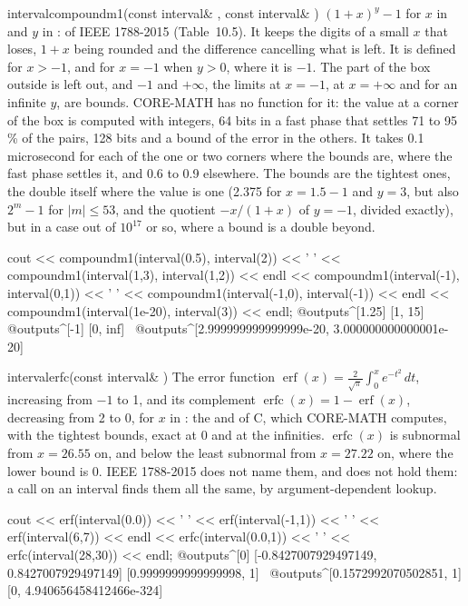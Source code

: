 \documentclass[12pt,a4paper,twoside,openright]{book}
\begin{document}
\begin{deffun}{interval}{compoundm1}{(const interval\& , const interval\& )}
  $(1+x)^y-1$ for $x$ in  and $y$ in :  of
  IEEE 1788-2015 (Table~10.5). It keeps the digits of a small $x$ that
   loses, $1+x$ being rounded and the difference
  cancelling what is left. It is defined for $x>-1$, and for $x=-1$ when
  $y>0$, where it is $-1$. The part of the box outside is left out, and $-1$
  and $+\infty$, the limits at $x=-1$, at $x=+\infty$ and for an infinite
  $y$, are bounds. CORE-MATH has no function for it: the value at a corner
  of the box is computed with integers, 64 bits in a fast phase that settles
  71 to 95\,\% of the pairs, 128 bits and a bound of the error in the others.
  It takes 0.1 microsecond for each of the one or two corners where the
  bounds are, where the fast phase settles it, and 0.6 to 0.9 elsewhere. The
  bounds are the tightest ones, the double itself where the value is one
  (2.375 for $x=1.5-1$ and $y=3$, but also $2^m-1$ for $|m|\le53$, and the
  quotient $-x/(1+x)$ of $y=-1$, divided exactly), but in a case out of
  $10^{17}$ or so, where a bound is a double beyond.\newinvfive
\begin{example}
cout << compoundm1(interval(0.5), interval(2)) << ' '
     << compoundm1(interval(1,3), interval(1,2)) << endl
     << compoundm1(interval(-1), interval(0,1)) << ' '
     << compoundm1(interval(-1,0), interval(-1)) << endl
     << compoundm1(interval(1e-20), interval(3)) << endl;
@outputs^[1.25] [1, 15]~
@outputs^[-1] [0, inf]~
@outputs^[2.999999999999999e-20, 3.000000000000001e-20]~
\end{example}
\end{deffun}

\begin{deffun}{interval}{erfc}{(const interval\& )}
  The error function $\operatorname{erf}(x)=\frac{2}{\sqrt{\pi}}\int_0^x
  e^{-t^2}\,dt$, increasing from $-1$ to 1, and its complement
  $\operatorname{erfc}(x)=1-\operatorname{erf}(x)$, decreasing from 2 to 0,
  for $x$ in : the  and  of C, which CORE-MATH
  computes, with the tightest bounds, exact at 0 and at the infinities.
  $\operatorname{erfc}(x)$ is subnormal from $x=26.55$ on, and below the
  least subnormal from $x=27.22$ on, where the lower bound is 0. IEEE
  1788-2015 does not name them, and  does not hold
  them: a call  on an interval finds them all the same,
  by argument-dependent lookup.\newinvfive
\begin{example}
cout << erf(interval(0.0)) << ' ' << erf(interval(-1,1)) << ' '
     << erf(interval(6,7)) << endl
     << erfc(interval(0.0,1)) << ' ' << erfc(interval(28,30)) << endl;
@outputs^[0] [-0.8427007929497149, 0.8427007929497149] [0.9999999999999998, 1]~
@outputs^[0.1572992070502851, 1] [0, 4.940656458412466e-324]~
\end{example}
\end{deffun}
\end{document}
